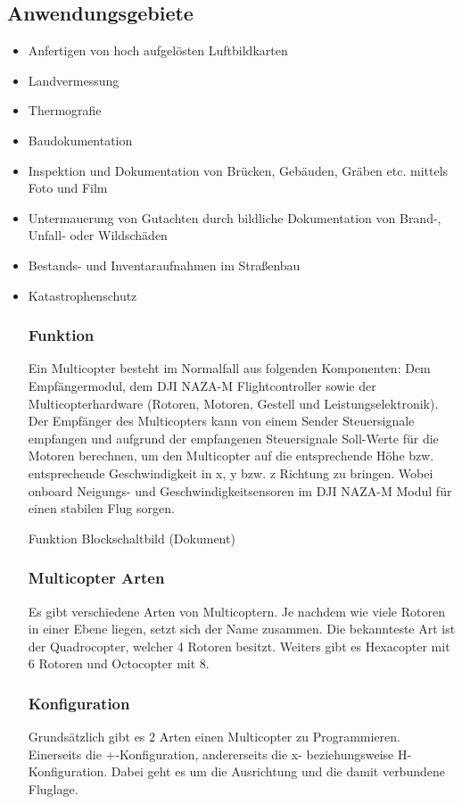   \subsection{Anwendungsgebiete}
  \begin{itemize}
    \item Anfertigen von hoch aufgelösten Luftbildkarten
    \item Landvermessung
    \item Thermografie
    \item Baudokumentation
    \item Inspektion und Dokumentation von Brücken, Gebäuden, Gräben etc. mittels Foto und Film
    \item Untermauerung von Gutachten durch bildliche Dokumentation von Brand-, Unfall- oder Wildschäden
    \item Bestands- und Inventaraufnahmen im Straßenbau
    \item Katastrophenschutz 

  \cite{copterAnwendung}


  \subsubsection{Funktion}
  Ein Multicopter besteht im Normalfall aus folgenden Komponenten:
  Dem Empfängermodul, dem DJI NAZA-M Flightcontroller sowie der Multicopterhardware (Rotoren, Motoren, Gestell und Leistungselektronik). Der Empfänger des Multicopters kann von einem Sender Steuersignale empfangen und aufgrund der empfangenen Steuersignale Soll-Werte für die Motoren berechnen, um den Multicopter auf die entsprechende Höhe bzw. entsprechende Geschwindigkeit in x, y bzw. z Richtung zu bringen. Wobei onboard Neigungs- und Geschwindigkeitsensoren im DJI NAZA-M Modul für einen stabilen Flug sorgen. 

  Funktion Blockschaltbild (Dokument)

  \subsubsection{Multicopter Arten}
  Es gibt verschiedene Arten von Multicoptern. 
  Je nachdem wie viele Rotoren in einer Ebene liegen, setzt sich der Name zusammen.
  Die bekannteste Art ist der Quadrocopter, welcher 4 Rotoren besitzt. Weiters gibt es Hexacopter mit 6 Rotoren und Octocopter mit 8.


  \subsubsection{Konfiguration}
  Grundsätzlich gibt es 2 Arten einen Multicopter zu Programmieren.
  Einerseits die +-Konfiguration, andererseits die x- beziehungsweise H-Konfiguration. Dabei geht es um die Ausrichtung und die damit verbundene Fluglage.


\end{itemize}
